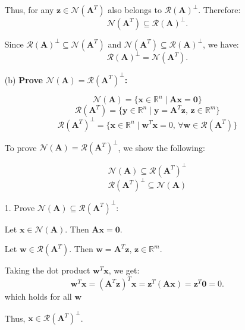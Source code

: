 \documentclass[12pt]{article}
\newcommand{\bmat}[1]{\mathbf{#1}} %
\begin{document}
\begin{itemize}
Thus, for any \( \mathbf{z} \in \mathcal{N}(\mathbf{A}^T) \) also belongs to \( \mathcal{R}(\mathbf{A})^\perp \). Therefore:
\[
\mathcal{N}(\mathbf{A}^T) \subseteq \mathcal{R}(\mathbf{A})^\perp.
\]
    \vspace{\baselineskip}

    Since \( \mathcal{R}(\mathbf{A})^\perp \subseteq \mathcal{N}(\mathbf{A}^T) \) and \( \mathcal{N}(\mathbf{A}^T) \subseteq \mathcal{R}(\mathbf{A})^\perp \), we have:
    \[
    \mathcal{R}(\mathbf{A})^\perp = \mathcal{N}(\mathbf{A}^T).
    \]

    \item[(b)] \textbf{Prove \( \mathcal{N}(\mathbf{A}) = \mathcal{R}(\mathbf{A}^T)^\perp \):}

 
    \[ \mathcal{N}(\mathbf{A}) = \{ \mathbf{x} \in \mathbb{R}^n \mid \mathbf{A}\mathbf{x} = \mathbf{0} \} \]
    \[ \mathcal{R}(\mathbf{A}^T) = \{ \mathbf{y} \in \mathbb{R}^n \mid \mathbf{y} = \mathbf{A}^T \mathbf{z}, \, \mathbf{z} \in \mathbb{R}^m \} \]
    \[ \mathcal{R}(\mathbf{A}^T)^\perp = \{ \mathbf{x} \in \mathbb{R}^n \mid \mathbf{w}^T \mathbf{x} = 0, \, \forall \mathbf{w} \in \mathcal{R}(\mathbf{A}^T) \} \]


    To prove \( \mathcal{N}(\mathbf{A}) = \mathcal{R}(\mathbf{A}^T)^\perp \), we show the following:
    
     \[\mathcal{N}(\mathbf{A}) \subseteq \mathcal{R}(\mathbf{A}^T)^\perp \]
     \[\mathcal{R}(\mathbf{A}^T)^\perp \subseteq \mathcal{N}(\mathbf{A}) \]
    
    \vspace{\baselineskip}

    1. Prove \( \mathcal{N}(\mathbf{A}) \subseteq \mathcal{R}(\mathbf{A}^T)^\perp \):
    
    Let \( \mathbf{x} \in \mathcal{N}(\mathbf{A}) \). Then \( \mathbf{A}\mathbf{x} = \mathbf{0} \).  
    
    Let \( \mathbf{w} \in \mathcal{R}(\mathbf{A}^T) \). Then \( \mathbf{w} = \mathbf{A}^T \mathbf{z}, \, \mathbf{z} \in \mathbb{R}^m \).  

    
    Taking the dot product \( \mathbf{w}^T \mathbf{x} \), we get:
    \[
    \mathbf{w}^T \mathbf{x} = (\mathbf{A}^T \mathbf{z})^T \mathbf{x} = \mathbf{z}^T (\mathbf{A} \mathbf{x}) = \mathbf{z}^T \mathbf{0} = 0.
    \]
    which holds for all $\bmat{w}$
    
    Thus, \( \mathbf{x} \in \mathcal{R}(\mathbf{A}^T)^\perp \).
    \vspace{\baselineskip}


\end{itemize}
\end{document}
